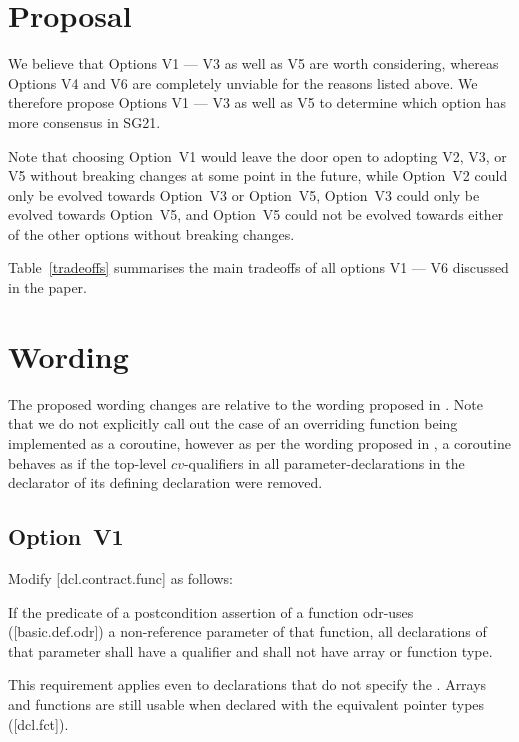 \section{Proposal}

We believe that Options V1 --- V3 as well as V5 are worth considering, whereas Options V4 and V6 are completely unviable for the reasons listed above. We therefore propose Options V1 --- V3 as well as V5 to determine which option has more consensus in SG21. 

Note that choosing Option~V1 would leave the door open to adopting V2, V3, or V5 without breaking changes at some point in the future, while Option~V2 could only be evolved towards Option~V3 or Option~V5, Option~V3 could only be evolved towards Option~V5, and Option~V5 could not be evolved towards either of the other options without breaking changes.

Table~\ref{tradeoffs} summarises the main tradeoffs of all options V1 --- V6 discussed in the paper.

\section{Wording}

The proposed wording changes are relative to the wording proposed in \cite{P2900R10}. Note that we do not explicitly call out the case of an overriding function being implemented as a coroutine, however as per the wording proposed in \cite{P2900R10}, a coroutine behaves as if the top-level $cv$-qualifiers in all parameter-declarations in the declarator of its defining declaration were removed.

\subsection*{Option~V1}

Modify [dcl.contract.func] as follows:

\begin{adjustwidth}{0.5cm}{0.5cm}
If the predicate of a postcondition assertion of a function odr-uses ([basic.def.odr]) a
non-reference parameter of that function, all declarations of that parameter shall have a  qualifier and shall not have array or function type.
\begin{note}
This requirement applies even to declarations
that do not specify the . Arrays and functions are still usable when declared with the equivalent pointer types ([dcl.fct]).
\end{note}
\begin{example}
\tcode{[...]}
\end{example}
\end{adjustwidth}

